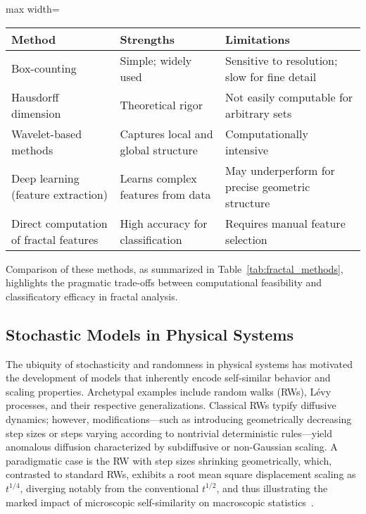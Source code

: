\documentclass[sigconf]{acmart}
\begin{document}
\begin{table*}[htbp]
\centering
\caption{Selected Approaches to Fractal Dimension Estimation and Their Applicability}
\label{tab:fractal_methods}
\begin{adjustbox}{max width=\textwidth}
\begin{tabular}{lll}
\toprule
\textbf{Method}                 & \textbf{Strengths}                          & \textbf{Limitations}                    \\
\midrule
Box-counting                    & Simple; widely used                         & Sensitive to resolution; slow for fine detail \\
Hausdorff dimension             & Theoretical rigor                           & Not easily computable for arbitrary sets      \\
Wavelet-based methods           & Captures local and global structure         & Computationally intensive                      \\
Deep learning (feature extraction) & Learns complex features from data         & May underperform for precise geometric structure \\
Direct computation of fractal features & High accuracy for classification     & Requires manual feature selection                \\
\bottomrule
\end{tabular}
\end{adjustbox}
\end{table*}

Comparison of these methods, as summarized in Table~\ref{tab:fractal_methods}, highlights the pragmatic trade-offs between computational feasibility and classificatory efficacy in fractal analysis.

\subsection{Stochastic Models in Physical Systems}

The ubiquity of stochasticity and randomness in physical systems has motivated the development of models that inherently encode self-similar behavior and scaling properties. Archetypal examples include random walks (RWs), Lévy processes, and their respective generalizations. Classical RWs typify diffusive dynamics; however, modifications—such as introducing geometrically decreasing step sizes or steps varying according to nontrivial deterministic rules—yield anomalous diffusion characterized by subdiffusive or non-Gaussian scaling. A paradigmatic case is the RW with step sizes shrinking geometrically, which, contrasted to standard RWs, exhibits a root mean square displacement scaling as $t^{1/4}$, diverging notably from the conventional $t^{1/2}$, and thus illustrating the marked impact of microscopic self-similarity on macroscopic statistics~\cite{ref57}.
\end{document}
